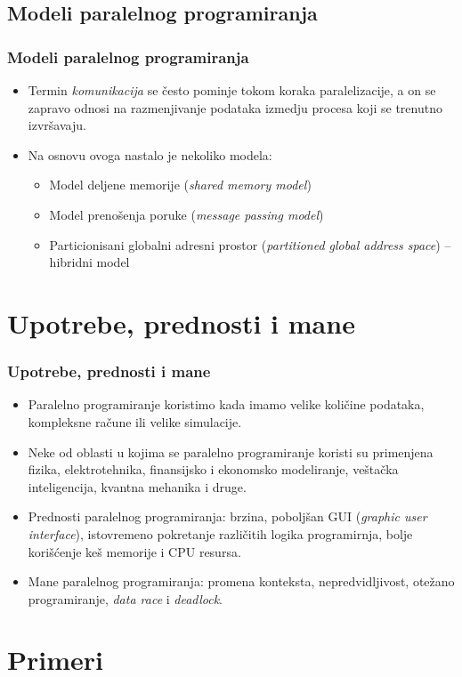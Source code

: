\documentclass{beamer}
\begin{document}
	\subsection{Modeli paralelnog programiranja}
	\begin{frame}[fragile]\frametitle{Modeli paralelnog programiranja}
		\begin{itemize}	
			\item Termin \emph{komunikacija} se često pominje tokom koraka paralelizacije, a on se zapravo odnosi na razmenjivanje podataka izmedju procesa koji se trenutno izvršavaju.
			\item Na osnovu ovoga nastalo je nekoliko modela:
			\begin{itemize}	
				\item Model deljene memorije (\emph{shared memory model})
				\item Model prenošenja poruke (\emph{message passing model})
				\item Particionisani globalni adresni prostor (\emph{partitioned global address space}) -- hibridni model
			\end{itemize}
		\end{itemize}
	\end{frame}
	
	\section{Upotrebe, prednosti i mane}
	\begin{frame}[fragile]\frametitle{Upotrebe, prednosti i mane}
		\begin{itemize}	
			\item Paralelno programiranje koristimo kada imamo velike količine podataka, kompleksne račune ili velike simulacije.
			\item Neke od oblasti u kojima se paralelno programiranje koristi su primenjena fizika, elektrotehnika, finansijsko i ekonomsko modeliranje, veštačka inteligencija, kvantna mehanika i druge.
			\bigskip
			\item Prednosti paralelnog programiranja: brzina, poboljšan GUI (\emph{graphic user interface}), istovremeno pokretanje različitih logika programirnja, bolje korišćenje keš memorije i CPU resursa.
			\item Mane paralelnog programiranja: promena konteksta, nepredvidljivost, otežano programiranje, \emph{data race} i \emph{deadlock}.
		\end{itemize}
	\end{frame}
	
	\section{Primeri}
	

	
\end{document}
